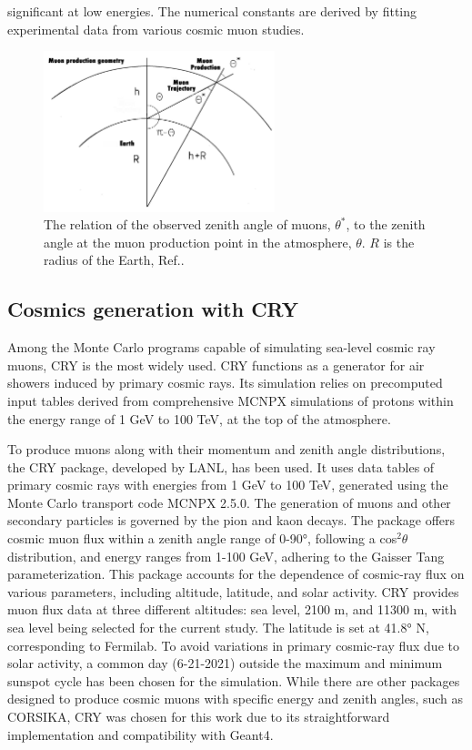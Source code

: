 significant at low energies. The numerical constants are derived by fitting experimental data from various cosmic muon studies.
\begin{figure}[!h]
    \centering
    \includegraphics[width =0.6\textwidth]{figures/png/Screenshot_20240526_140716.png}
    \caption{The relation of the observed zenith angle of muons, $\theta^*$, to the zenith angle at the muon production point in the atmosphere, $\theta$. 
    $R$ is the radius of the Earth, Ref.\cite{guan2015parametrization}.}
    \label{fig:anglesinmuon}
\end{figure}

\subsection{Cosmics generation with CRY}
Among the Monte Carlo programs capable of simulating sea-level cosmic ray muons, 
CRY is the most widely used. CRY functions as a generator for air showers induced by primary cosmic rays. 
Its simulation relies on precomputed input tables derived from comprehensive MCNPX simulations of protons 
within the energy range of 1 GeV to 100 TeV, at the top of the atmosphere.

To produce muons along with their momentum and zenith angle distributions, 
the CRY package, developed by LANL, has been used. It uses data tables of primary 
cosmic rays with energies from 1 GeV to 100 TeV, generated using the Monte Carlo transport code MCNPX 2.5.0. 
The generation of muons and other secondary particles is governed by the pion and kaon decays. 
The package offers cosmic muon flux within a zenith angle range of 0-90°, following a cos$^2 \theta$ distribution, 
and energy ranges from 1-100 GeV, adhering to the Gaisser Tang parameterization. 
This package accounts for the dependence of cosmic-ray flux on various parameters, including altitude, latitude, and solar activity.
CRY provides muon flux data at three different altitudes: sea level, 2100 m, and 11300 m, with sea level being selected for the current study. 
The latitude is set at 41.8° N, corresponding to Fermilab. 
To avoid variations in primary cosmic-ray flux due to solar activity, a common day (6-21-2021) outside the maximum and minimum sunspot cycle has been chosen for the simulation.
While there are other packages designed to produce cosmic muons with specific energy and zenith angles, 
such as CORSIKA, CRY was chosen for this work due to its straightforward implementation and compatibility with Geant4.
